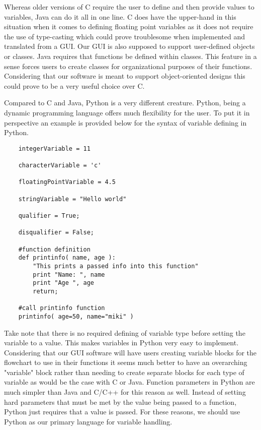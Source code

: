 \documentclass[journal,10pt,onecolumn,compsoc]{IEEEtran} \usepackage[margin=1.0in]{geometry} \usepackage{pdfpages} \usepackage{graphicx}
\begin{document}
\noindent Whereas older versions of C require the user to define and then provide values to variables, Java can do it all in one line. \cite{javavar} 
C does have the upper-hand in this situation when it comes to defining floating point variables as it does not require the use of type-casting which could prove troublesome when implemented and translated from a GUI.
Our GUI is also supposed to support user-defined objects or classes.
Java requires that functions be defined within classes.\cite{javafunction}
This feature in a sense forces users to create classes for organizational purposes of their functions.
Considering that our software is meant to support object-oriented designs this could prove to be a very useful choice over C.

\noindent Compared to C and Java, Python is a very different creature.
Python, being a dynamic programming language offers much flexibility for the user.
To put it in perspective an example is provided below for the syntax of variable defining in Python.

\begin{lstlisting}
	integerVariable = 11

	characterVariable = 'c'

	floatingPointVariable = 4.5

	stringVariable = "Hello world"

	qualifier = True;

	disqualifier = False;
    
	#function definition
	def printinfo( name, age ):
		"This prints a passed info into this function"
		print "Name: ", name
		print "Age ", age
		return;
	
	#call printinfo function
	printinfo( age=50, name="miki" )
\end{lstlisting}

\noindent Take note that there is no required defining of variable type before setting the variable to a value. \cite{pythonvar} 
This makes variables in Python very easy to implement.
Considering that our GUI software will have users creating variable blocks for the flowchart to use in their functions it seems much better to have an overarching "variable" block rather than needing to create separate blocks for each type of variable as would be the case with C or Java.
Function parameters in Python are much simpler than Java and C/C++ for this reason as well. 
Instead of setting hard parameters that must be met by the value being passed to a function, Python just requires that a value is passed. \cite{pythonfunction} 
For these reasons, we should use Python as our primary language for variable handling.
\end{document}
